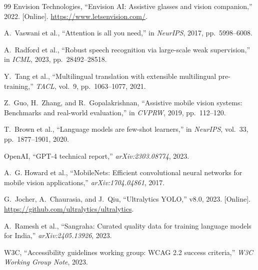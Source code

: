 \documentclass[pdflatex,sn-mathphys-num]{sn-jnl}
\theoremstyle{thmstyleone}%
\theoremstyle{thmstyletwo}%
\theoremstyle{thmstylethree}%
\begin{document}
\begin{thebibliography}{99}
Envision Technologies, ``Envision AI: Assistive glasses and vision companion,''
2022. [Online]. \url{https://www.letsenvision.com/}.

A.~Vaswani et al., ``Attention is all you need,'' in \textit{NeurIPS}, 2017,
pp.\ 5998--6008.

A.~Radford et al., ``Robust speech recognition via large-scale weak supervision,''
in \textit{ICML}, 2023, pp.\ 28492--28518.

Y.~Tang et al., ``Multilingual translation with extensible multilingual
pre-training,'' \textit{TACL}, vol.\ 9, pp.\ 1063--1077, 2021.

Z.~Guo, H.~Zhang, and R.~Gopalakrishnan, ``Assistive mobile vision systems:
Benchmarks and real-world evaluation,'' in \textit{CVPRW}, 2019, pp.\ 112--120.

T.~Brown et al., ``Language models are few-shot learners,'' in \textit{NeurIPS},
vol.\ 33, pp.\ 1877--1901, 2020.

OpenAI, ``GPT-4 technical report,'' \textit{arXiv:2303.08774}, 2023.

A.~G. Howard et al., ``MobileNets: Efficient convolutional neural networks for
mobile vision applications,'' \textit{arXiv:1704.04861}, 2017.

G.~Jocher, A.~Chaurasia, and J.~Qiu, ``Ultralytics YOLO,'' v8.0, 2023.
[Online]. \url{https://github.com/ultralytics/ultralytics}.

A.~Ramesh et al., ``Sangraha: Curated quality data for training language models
for India,'' \textit{arXiv:2405.13926}, 2023.

W3C, ``Accessibility guidelines working group: WCAG 2.2 success criteria,''
\textit{W3C Working Group Note}, 2023.

\end{thebibliography}
\end{document}
